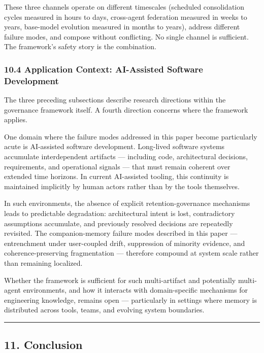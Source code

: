 \documentclass[
  11pt,
]{article}
\begin{document}
These three channels operate on different timescales (scheduled
consolidation cycles measured in hours to days, cross-agent federation
measured in weeks to years, base-model evolution measured in months to
years), address different failure modes, and compose without
conflicting. No single channel is sufficient. The framework's safety
story is the combination.

\hypertarget{application-context-ai-assisted-software-development}{%
\subsubsection{10.4 Application Context: AI-Assisted Software
Development}\label{application-context-ai-assisted-software-development}}

The three preceding subsections describe research directions within the
governance framework itself. A fourth direction concerns where the
framework applies.

One domain where the failure modes addressed in this paper become
particularly acute is AI-assisted software development. Long-lived
software systems accumulate interdependent artifacts --- including code,
architectural decisions, requirements, and operational signals --- that
must remain coherent over extended time horizons. In current AI-assisted
tooling, this continuity is maintained implicitly by human actors rather
than by the tools themselves.

In such environments, the absence of explicit retention-governance
mechanisms leads to predictable degradation: architectural intent is
lost, contradictory assumptions accumulate, and previously resolved
decisions are repeatedly revisited. The companion-memory failure modes
described in this paper --- entrenchment under user-coupled drift,
suppression of minority evidence, and coherence-preserving fragmentation
--- therefore compound at system scale rather than remaining localized.

Whether the framework is sufficient for such multi-artifact and
potentially multi-agent environments, and how it interacts with
domain-specific mechanisms for engineering knowledge, remains open ---
particularly in settings where memory is distributed across tools,
teams, and evolving system boundaries.

\begin{center}\rule{0.5\linewidth}{0.5pt}\end{center}

\hypertarget{conclusion}{%
\subsection{11. Conclusion}\label{conclusion}}
\end{document}
